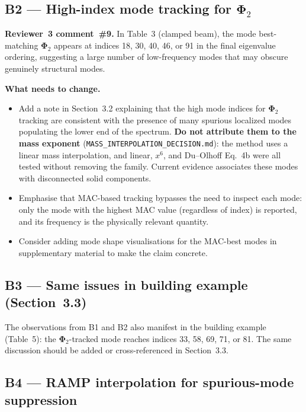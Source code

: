 \documentclass[12pt,a4paper]{article}
\begin{document}
\subsection{B2 --- High-index mode tracking for \texorpdfstring{$\boldsymbol{\Phi}_2$}{Phi\_2}}

\textbf{Reviewer~3 comment~\#9.}  In Table~3 (clamped beam), the mode
best-matching $\boldsymbol{\Phi}_2$ appears at indices 18, 30, 40, 46, or 91
in the final eigenvalue ordering, suggesting a large number of low-frequency
modes that may obscure genuinely structural modes.

\textbf{What needs to change.}
\begin{itemize}[leftmargin=1.6em]
  \item Add a note in Section~3.2 explaining that the high mode indices
        for $\boldsymbol{\Phi}_2$ tracking are consistent with the presence
        of many spurious localized modes populating the lower end of the
        spectrum.  \textbf{Do not attribute them to the mass exponent}
        (\texttt{MASS\_INTERPOLATION\_DECISION.md}): the method uses a linear
        mass interpolation, and linear, $x^6$, and Du--Olhoff Eq.~4b were all
        tested without removing the family.  Current evidence associates these
        modes with disconnected solid components.
  \item Emphasise that MAC-based tracking bypasses the need to inspect each
        mode: only the mode with the highest MAC value (regardless of index)
        is reported, and its frequency is the physically relevant quantity.
  \item Consider adding mode shape visualisations for the MAC-best modes
        in supplementary material to make the claim concrete.
\end{itemize}

\subsection{B3 — Same issues in building example (Section~3.3)}

The observations from B1 and B2 also manifest in the building example
(Table~5): the $\boldsymbol{\Phi}_2$-tracked mode reaches indices 33, 58, 69,
71, or 81. The same discussion should be added or cross-referenced in
Section~3.3.

\subsection{B4 — RAMP interpolation for spurious-mode suppression}
\end{document}
